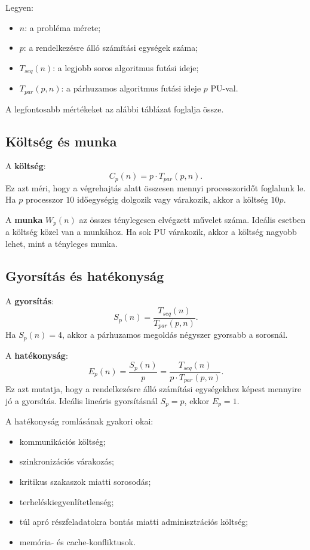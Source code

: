 Legyen:

\begin{itemize}
  \item $n$: a probléma mérete;
  \item $p$: a rendelkezésre álló számítási egységek száma;
  \item $T_{seq}(n)$: a legjobb soros algoritmus futási ideje;
  \item $T_{par}(p,n)$: a párhuzamos algoritmus futási ideje $p$ PU-val.
\end{itemize}

A legfontosabb mértékeket az alábbi táblázat foglalja össze.

\begin{center}

\end{center}

\subsection{Költség és munka}

A \textbf{költség}:
\[
C_p(n)=p\cdot T_{par}(p,n).
\]
Ez azt méri, hogy a végrehajtás alatt összesen mennyi processzoridőt foglalunk le. Ha $p$ processzor $10$ időegységig dolgozik vagy várakozik, akkor a költség $10p$.

A \textbf{munka} $W_p(n)$ az összes ténylegesen elvégzett művelet száma. Ideális esetben a költség közel van a munkához. Ha sok PU várakozik, akkor a költség nagyobb lehet, mint a tényleges munka.

\subsection{Gyorsítás és hatékonyság}

A \textbf{gyorsítás}:
\[
S_p(n)=\frac{T_{seq}(n)}{T_{par}(p,n)}.
\]
Ha $S_p(n)=4$, akkor a párhuzamos megoldás négyszer gyorsabb a sorosnál.

A \textbf{hatékonyság}:
\[
E_p(n)=\frac{S_p(n)}{p}=\frac{T_{seq}(n)}{p\cdot T_{par}(p,n)}.
\]
Ez azt mutatja, hogy a rendelkezésre álló számítási egységekhez képest mennyire jó a gyorsítás. Ideális lineáris gyorsításnál $S_p=p$, ekkor $E_p=1$.

A hatékonyság romlásának gyakori okai:

\begin{itemize}
  \item kommunikációs költség;
  \item szinkronizációs várakozás;
  \item kritikus szakaszok miatti sorosodás;
  \item terheléskiegyenlítetlenség;
  \item túl apró részfeladatokra bontás miatti adminisztrációs költség;
  \item memória- és cache-konfliktusok.
\end{itemize}

